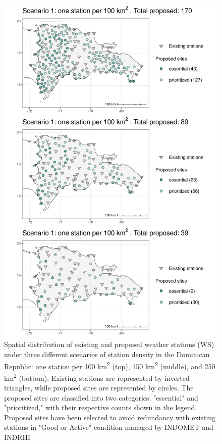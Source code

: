 \documentclass[spanish]{article}
\begin{document}
\begin{figure}[!ht]

{\centering \includegraphics[width=0.7\linewidth]{figuras/esc_100_150_250_activas_buenas_mapa_eng} 

}

\caption{Spatial distribution of existing and proposed weather stations (WS) under three different scenarios of station density in the Dominican Republic: one station per 100 km\textsuperscript{2} (top), 150 km\textsuperscript{2} (middle), and 250 km\textsuperscript{2} (bottom). Existing stations are represented by inverted triangles, while proposed sites are represented by circles. The proposed sites are classified into two categories: "essential" and "prioritized," with their respective counts shown in the legend. Proposed sites have been selected to avoid redundancy with existing stations in "Good or Active" condition managed by INDOMET and INDRHI}\label{fig:esc_100_150_250_activas_buenas_mapa_eng}
\end{figure}
\end{document}
